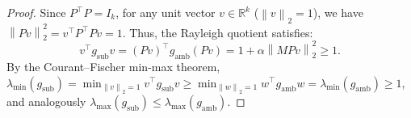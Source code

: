 \documentclass[11pt,a4paper]{article}
\theoremstyle{definition}
\theoremstyle{plain}
\theoremstyle{remark}
\newcommand{\R}{\mathbb{R}}
\newcommand{\norm}[1]{\left\lVert #1 \right\rVert}
\begin{document}
\begin{proof}
Since $P^\top P = I_k$, for any unit vector $v \in \R^k$ ($\norm{v}_2 = 1$), we have $\norm{Pv}_2^2 = v^\top P^\top P v = 1$. Thus, the Rayleigh quotient satisfies:
\begin{equation*}
    v^\top g_{\mathrm{sub}} v = (Pv)^\top g_{\mathrm{amb}} (Pv) = 1 + \alpha \norm{M P v}_2^2 \ge 1.
\end{equation*}
By the Courant--Fischer min-max theorem, $\lambda_{\min}(g_{\mathrm{sub}}) = \min_{\norm{v}_2=1} v^\top g_{\mathrm{sub}} v \ge \min_{\norm{w}_2=1} w^\top g_{\mathrm{amb}} w = \lambda_{\min}(g_{\mathrm{amb}}) \ge 1$, and analogously $\lambda_{\max}(g_{\mathrm{sub}}) \le \lambda_{\max}(g_{\mathrm{amb}})$.
\end{proof}
\end{document}
